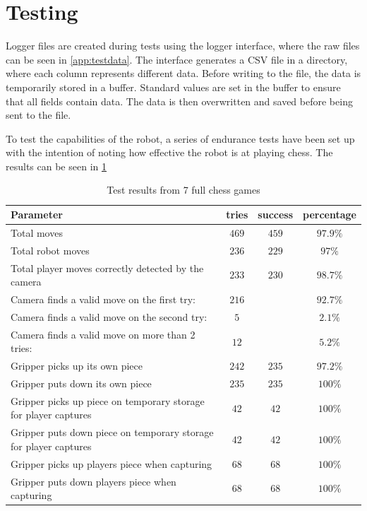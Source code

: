 \section{Testing}
Logger files are created during tests using the logger interface, where the raw files can be seen in \cref{app:testdata}. The interface generates a CSV file in a directory, where each column represents different data. Before writing to the file, the data is temporarily stored in a buffer. Standard values are set in the buffer to ensure that all fields contain data. The data is then overwritten and saved before being sent to the file.

To test the capabilities of the robot, a series of endurance tests have been set up with the intention of noting how effective the robot is at playing chess. The results can be seen in \cref{tab:robot-stats}

\begin{table}[h]
\centering
\begin{tabular}{|l|c c c|}
\hline
\textbf{Parameter} & \textbf{tries} & \textbf{success} & \textbf{percentage} \\
\hline
Total moves & $469$ & $459$ & $97.9 \%$\\
Total robot moves & $236$ & $229$ & $97 \%$\\
Total player moves correctly detected by the camera & $233$ & $230$ & $98.7\%$\\
Camera finds a valid move on the first try: & $216$ &  & $92.7\%$ \\
Camera finds a valid move on the second try: & $5$ &  & $2.1\%$\\
Camera finds a valid move on more than 2 tries: & $12$ &  & $5.2\%$ \\

\hline
Gripper picks up its own piece & $242$ & $235$ & $97.2\%$ \\
Gripper puts down its own piece & $235$ & $235$ & $100\%$\\
Gripper picks up piece on temporary storage for player captures & $42$ & $42$ & $100\%$\\
Gripper puts down piece on temporary storage for player captures & $42$ & $42$ & $100\%$\\
Gripper picks up players piece when capturing & $68$ & $68$ & $100\%$ \\
Gripper puts down players piece when capturing & $68$ & $68$ & $100\%$\\
\hline
\end{tabular}
\caption{Test results from 7 full chess games}
\label{tab:robot-stats}
\end{table}

